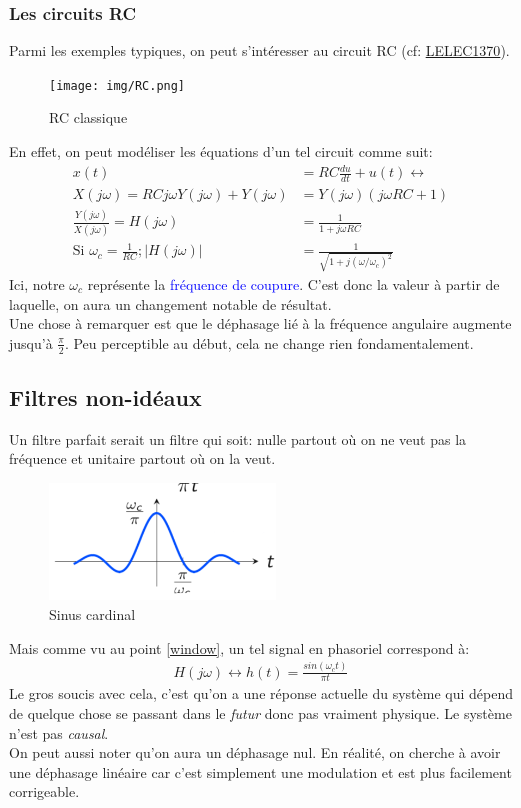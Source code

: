 \documentclass{report}
\begin{document}
\newpage %

\subsubsection{Les circuits RC}
Parmi les exemples typiques, on peut s'intéresser au circuit RC (cf: \href{https://github.com/Tfloow/Q4_EPL/blob/main/SynthèseCompilée/LELEC1370.pdf}{LELEC1370}). 
\begin{figure}
\centering
\texttt{[image: img/RC.png]}
\caption{RC classique}
\end{figure}
En effet, on peut modéliser les équations d'un tel circuit comme suit:
\begin{align*}
x(t) &= R C \frac{du}{dt} + u(t) \longleftrightarrow\\
X(j \omega) = RC j \omega Y(j \omega) + Y(j \omega) &= Y(j \omega) (j\omega RC+1)\\
\frac{Y(j \omega)}{X(j \omega)} = H(j \omega) &= \frac{1}{1+ j \omega RC}\\
\text{Si } \omega_c = \frac{1}{RC}; |H(j\omega)| &= \frac{1}{\sqrt{1 + j(\omega / \omega_c)^2}}
\end{align*}
Ici, notre $\omega_c$ représente la \textcolor{blue}{fréquence de coupure}. C'est donc la valeur à partir de laquelle, on aura un changement notable de résultat.\\
Une chose à remarquer est que le déphasage lié à la fréquence angulaire augmente jusqu'à $\frac{\pi}{2}$. Peu perceptible au début, cela ne change rien fondamentalement.

\subsection{Filtres non-idéaux}
Un filtre parfait serait un filtre qui soit: nulle partout où on ne veut pas la fréquence et unitaire partout où on la veut.\\
\begin{figure}
\centering
\includegraphics[width=6cm]{img/sinc.png}
\caption{Sinus cardinal}
\end{figure}
Mais comme vu au point \ref{window}, un tel signal en phasoriel correspond à:
\begin{align*}
H(j\omega) \longleftrightarrow h(t) = \frac{sin(\omega_c t)}{\pi t}
\end{align*}
Le gros soucis avec cela, c'est qu'on a une réponse actuelle du système qui dépend de quelque chose se passant dans le \textit{futur} donc pas vraiment physique. Le système n'est pas \textit{causal}.\\
On peut aussi noter qu'on aura un déphasage nul. En réalité, on cherche à avoir une déphasage linéaire car c'est simplement une modulation et est plus facilement corrigeable.
\end{document}
